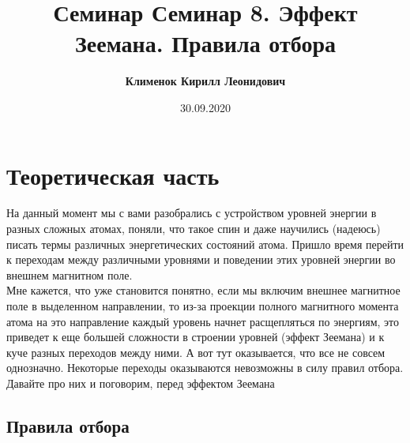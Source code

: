 \documentclass[12pt]{article}
\begin{document}
 
\title{\textbf{Семинар Семинар 8. Эффект Зеемана. Правила отбора}}
\author{\textbf{Клименок Кирилл Леонидович}}
\date{30.09.2020}
\maketitle
\section{Теоретическая часть}
На данный момент мы с вами разобрались с устройством уровней энергии в разных сложных атомах, поняли, что такое спин и даже научились (надеюсь) писать термы различных энергетических состояний атома. Пришло время перейти к переходам между различными уровнями и поведении этих уровней энергии во внешнем магнитном поле.\\
Мне кажется, что уже становится понятно, если мы включим внешнее магнитное поле в выделенном направлении, то из-за проекции полного магнитного момента атома на это направление каждый уровень начнет расщепляться по энергиям, это приведет к еще большей сложности в строении уровней (эффект Зеемана) и к куче разных переходов между ними. А вот тут оказывается, что все не совсем однозначно. Некоторые переходы оказываются невозможны в силу правил отбора. Давайте про них и поговорим, перед эффектом Зеемана
\subsection{Правила отбора}
\end{document}
